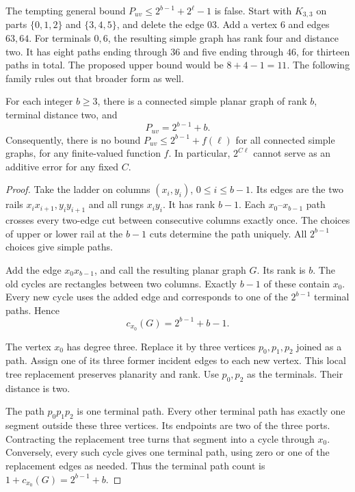 The tempting general bound $P_{uv}\le2^{b-1}+2^\ell-1$ is false.
Start with $K_{3,3}$ on parts $\{0,1,2\}$ and $\{3,4,5\}$, and delete the edge $03$.
Add a vertex $6$ and edges $63,64$.
For terminals $0,6$, the resulting simple graph has rank four and distance two.
It has eight paths ending through $36$ and five ending through $46$, for thirteen paths in total.
The proposed upper bound would be $8+4-1=11$.
The following family rules out that broader form as well.

\begin{proposition}
\label{prop:path-distance-two-obstruction}
For each integer $b\ge3$, there is a connected simple planar graph of rank $b$, terminal distance two, and
\[
 P_{uv}=2^{b-1}+b.
\]
Consequently, there is no bound $P_{uv}\le2^{b-1}+f(\ell)$ for all connected simple graphs, for any finite-valued function $f$.
In particular, $2^{C\ell}$ cannot serve as an additive error for any fixed $C$.
\end{proposition}

\begin{proof}
Take the ladder on columns $(x_i,y_i)$, $0\le i\le b-1$.
Its edges are the two rails $x_ix_{i+1},y_iy_{i+1}$ and all rungs $x_iy_i$.
It has rank $b-1$.
Each $x_0$--$x_{b-1}$ path crosses every two-edge cut between consecutive columns exactly once.
The choices of upper or lower rail at the $b-1$ cuts determine the path uniquely.
All $2^{b-1}$ choices give simple paths.

Add the edge $x_0x_{b-1}$, and call the resulting planar graph $G$.
Its rank is $b$.
The old cycles are rectangles between two columns.
Exactly $b-1$ of these contain $x_0$.
Every new cycle uses the added edge and corresponds to one of the $2^{b-1}$ terminal paths.
Hence
\[
 c_{x_0}(G)=2^{b-1}+b-1.
\]

The vertex $x_0$ has degree three.
Replace it by three vertices $p_0,p_1,p_2$ joined as a path.
Assign one of its three former incident edges to each new vertex.
This local tree replacement preserves planarity and rank.
Use $p_0,p_2$ as the terminals.
Their distance is two.

The path $p_0p_1p_2$ is one terminal path.
Every other terminal path has exactly one segment outside these three vertices.
Its endpoints are two of the three ports.
Contracting the replacement tree turns that segment into a cycle through $x_0$.
Conversely, every such cycle gives one terminal path, using zero or one of the replacement edges as needed.
Thus the terminal path count is $1+c_{x_0}(G)=2^{b-1}+b$.
\end{proof}

